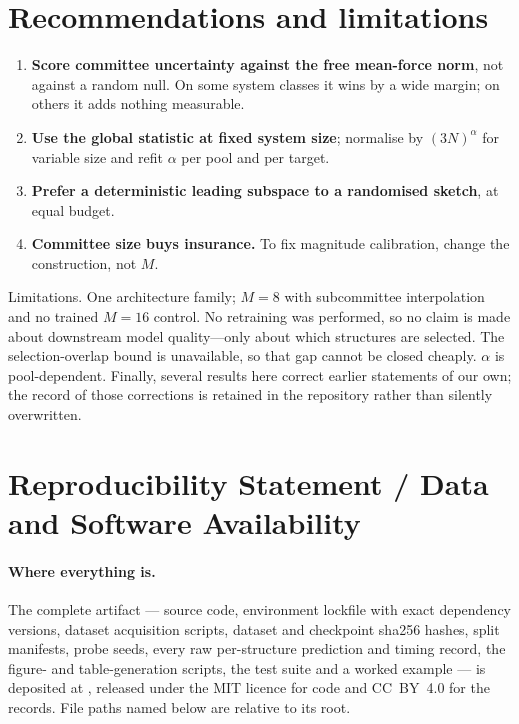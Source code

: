 \section{Recommendations and limitations}

\begin{enumerate}
\item \textbf{Score committee uncertainty against the free mean-force norm}, not
against a random null. On some system classes it wins by a wide margin; on others
it adds nothing measurable.
\item \textbf{Use the global statistic at fixed system size}; normalise by
$(3N)^{\alpha}$ for variable size and refit $\alpha$ per pool and per target.
\item \textbf{Prefer a deterministic leading subspace to a randomised sketch}, at
equal budget.
\item \textbf{Committee size buys insurance.} To fix magnitude calibration,
change the construction, not $M$.
\end{enumerate}

Limitations. One architecture family; $M=8$ with subcommittee interpolation and
no trained $M=16$ control. No retraining was performed, so no claim is made about
downstream model quality---only about which structures are selected. The
selection-overlap bound is unavailable, so that gap cannot be closed cheaply.
$\alpha$ is pool-dependent. Finally, several results here correct earlier
statements of our own; the record of those corrections is retained in the
repository rather than silently overwritten.

\section*{Reproducibility Statement / Data and Software Availability}
\label{sec:avail}

\paragraph{Where everything is.}
The complete artifact --- source code, environment lockfile with exact dependency
versions, dataset acquisition scripts, dataset and checkpoint sha256 hashes, split
manifests, probe seeds, every raw per-structure prediction and timing record, the
figure- and table-generation scripts, the test suite and a worked example ---
is deposited at \fsArtifactLink, released under the MIT licence for code and
CC~BY~4.0 for the records. File paths named below are relative to its root.

